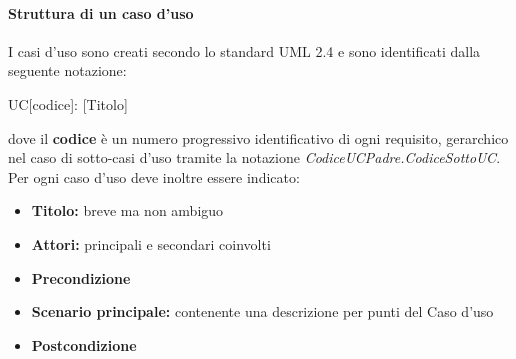 \documentclass[12pt,a4paper]{article}
\begin{document}
\paragraph{Struttura di un caso d'uso}
I casi d'uso sono creati secondo lo standard UML 2.4 e sono identificati dalla seguente notazione:
\begin{center}
	UC[codice]: [Titolo]
\end{center}
dove il \textbf{codice} è un numero progressivo identificativo di ogni requisito, gerarchico nel  caso di sotto-casi d'uso tramite la notazione \textit{CodiceUCPadre.CodiceSottoUC}. Per ogni caso d'uso deve inoltre essere indicato:
\begin{itemize}
	\item \textbf{Titolo:} breve ma non ambiguo
	\item \textbf{Attori:} principali e secondari coinvolti
	\item \textbf{Precondizione}
	\item \textbf{Scenario principale:} contenente una descrizione per punti del Caso d'uso
	\item \textbf{Postcondizione}
\end{itemize}
\end{document}
